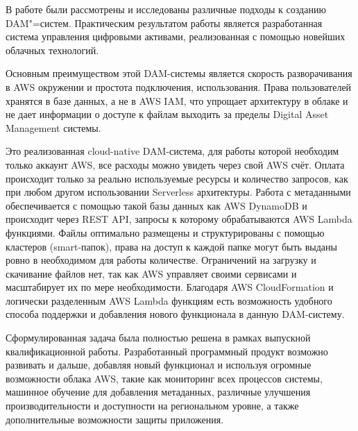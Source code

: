 

В работе были рассмотрены и исследованы различные подходы к созданию DAM"=систем. Практическим результатом работы является разработанная система управления цифровыми активами, реализованная с помощью новейших облачных технологий. 

Основным преимуществом этой DAM-системы является скорость разворачивания в AWS окружении и простота подключения, использования. Права пользователей хранятся в базе данных, а не в AWS IAM, что упрощает архитектуру в облаке и не дает информации о доступе к файлам выходить за пределы Digital Asset Management системы. 

Это реализованная cloud-native DAM-система, для работы которой необходим только аккаунт AWS, все расходы можно увидеть через свой AWS счёт. Оплата происходит только за реально используемые ресурсы и количество запросов, как при любом другом использовании Serverless архитектуры. Работа с метаданными обеспечивается с помощью такой базы данных как AWS DynamoDB и происходит через REST API, запросы к которому обрабатываются AWS Lambda функциями. Файлы оптимально размещены и структурированы с помощью кластеров (smart-папок), права на доступ к каждой папке могут быть выданы ровно в необходимом для работы количестве. Ограничений на загрузку и скачивание файлов нет, так как AWS управляет своими сервисами и масштабирует их по мере необходимости.
Благодаря AWS CloudFormation и логически разделенным AWS Lambda функциям есть возможность удобного способа поддержки и добавления нового функционала в данную DAM-систему.

Сформулированная задача была полностью решена в рамках выпускной квалификационной работы. Разработанный программный продукт возможно развивать и дальше, добавляя новый функционал и используя огромные возможности облака AWS, такие как мониторинг всех процессов системы, машинное обучение для добавления метаданных, различные улучшения производительности и доступности на региональном уровне, а также дополнительные возможности защиты приложения.